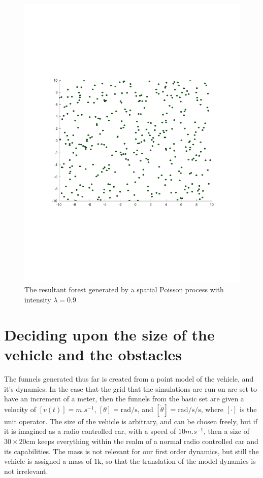 \begin{figure}
\begin{minipage}[b]{0.4\textwidth}
    \includegraphics[width=\textwidth]{figures/experiments/poisson09}
    \caption{The resultant forest generated by a spatial Poisson process with
      intensity \(\lambda = 0.9\)}
    \label{fig:poisson09}
  \end{minipage}
\end{figure}

\section{Deciding upon the size of the vehicle and the obstacles}

The funnels generated thus far is created from a point model of the vehicle, and
it's dynamics. In the case that the grid that the simulations are run on are set
to have an increment of a meter, then the funnels from the basic set are given a
velocity of \([v(t)] = \si{m.s^{-1}}\), \([\theta] = \si{\radian\per\second}\),
and \([\dot{\theta}] = \si{\radian\per\second\per\second}\), where \([\cdot]\)
is the unit operator. The size of the vehicle is arbitrary, and can be chosen
freely, but if it is imagined as a radio controlled car, with a speed of
\(10\si{m.s^{-1}}\), then a size of \(30 \times 20 \si{\centi\metre} \) keeps
everything within the realm of a normal radio controlled car and its
capabilities. The mass is not relevant for our first order dynamics, but still
the vehicle is assigned a mass of \(1 \si{\kilo}\), so that the translation of
the model dynamics is not irrelevant.

